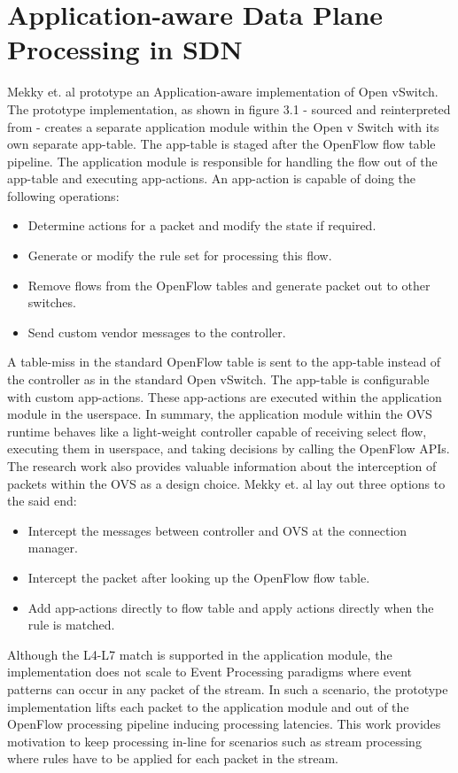 \section{Application-aware Data Plane Processing in SDN}
Mekky et. al \cite{mekky2014application} prototype an Application-aware implementation of Open vSwitch. The prototype implementation, as shown in figure 3.1 - sourced and reinterpreted from \cite{mekky2014application} -  creates a separate application module within the Open v Switch with its own separate app-table. The app-table is staged after the OpenFlow flow table pipeline. The application module is responsible for handling the flow out of the app-table and executing app-actions. An app-action is capable of doing the following operations:
\begin{itemize}
\item Determine actions for a packet and modify the state if required.
\item Generate or modify the rule set for processing this flow.
\item Remove flows from the OpenFlow tables and generate packet out to other switches.
\item Send custom vendor messages to the controller.
\end{itemize}
A table-miss in the standard OpenFlow table is sent to the app-table instead of the controller as in the standard Open vSwitch. The app-table is configurable with custom app-actions. These app-actions are executed within the application module in the userspace. In summary, the application module within the OVS runtime behaves like a light-weight controller capable of receiving select flow, executing them in userspace, and taking decisions by calling the OpenFlow APIs. The research work also provides valuable information about the interception of packets within the OVS as a design choice. Mekky et. al lay out three options to the said end:
\begin{itemize}
 \item Intercept the messages between controller and OVS at the connection manager.
 \item Intercept the packet after looking up the OpenFlow flow table.
 \item Add app-actions directly to flow table and apply actions directly when the rule is matched.
\end{itemize}
 Although the L4-L7 match is supported in the application module, the implementation does not scale to Event Processing paradigms where event patterns can occur in any packet of the stream. In such a scenario, the prototype implementation lifts each packet to the application module and out of the OpenFlow processing pipeline inducing processing latencies. This work provides motivation to keep processing in-line for scenarios such as stream processing where rules have to be applied for each packet in the stream.


